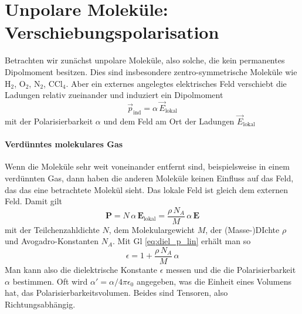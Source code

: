 %

\section{Unpolare Moleküle: Verschiebungspolarisation}

Betrachten wir zunächst unpolare Moleküle, also solche, die kein permanentes Dipolmoment  besitzen. Dies sind insbesondere zentro-symmetrische Moleküle wie H$_2$,  O$_2$,  N$_2$,  CCl$_4$. Aber ein externes angelegtes elektrisches Feld verschiebt die Ladungen relativ zueinander und induziert ein Dipolmoment
\begin{equation}
 \vec{p}_\text{ind} = \alpha \, \vec{E}_\text{lokal}
\end{equation}
mit der Polarisierbarkeit $\alpha$ und dem Feld am Ort der Ladungen $\vec{E}_\text{lokal}$

\paragraph{Verdünntes molekulares Gas} Wenn die Moleküle sehr weit voneinander entfernt sind, beispielsweise in einem verdünnten Gas, dann haben die anderen Moleküle keinen Einfluss auf das Feld, das das eine betrachtete Molekül sieht. Das lokale Feld ist gleich dem externen Feld.
 Damit gilt
\begin{equation}
 \mathbf{P} = N \, \alpha \, \mathbf{E}_\text{lokal} =  \frac{\rho \, N_A } {M} \, \alpha \, \mathbf{E} \label{eq:diel_pind}
\end{equation}
mit der Teilchenzahldichte $N$, dem Molekulargewicht $M$, der (Masse-)DIchte $\rho$ und Avogadro-Konstanten $N_A$. Mit Gl \ref{eq:diel_p_lin} erhält man so
\begin{equation}
 \epsilon = 1 +  \frac{\rho \, N_A } {M} \, \alpha  
\end{equation}
Man kann also die dielektrische Konstante $\epsilon$ messen und die die Polarisierbarkeit $\alpha$ bestimmen. Oft wird $\alpha' = \alpha / 4 \pi \epsilon_0$ angegeben, was die Einheit eines Volumens hat, das Polarisierbarkeitsvolumen. Beides sind Tensoren, also Richtungsabhängig.

